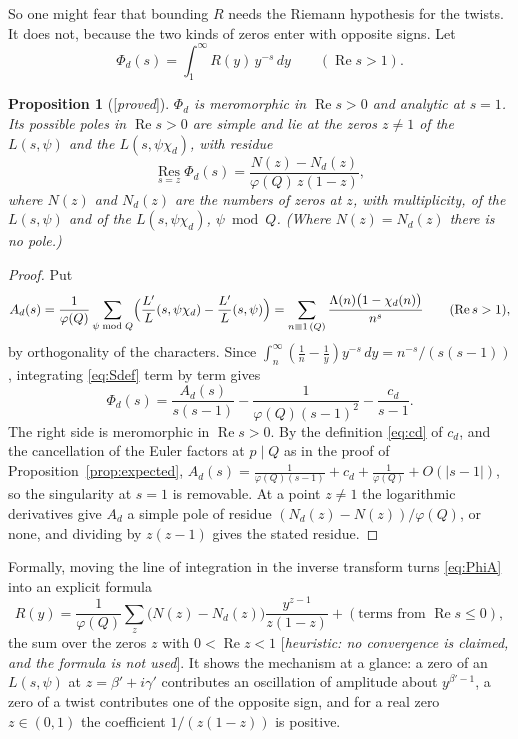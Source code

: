 \documentclass[11pt]{amsart}
\numberwithin{equation}{section}
\newtheorem{proposition}[theorem]{Proposition}
\theoremstyle{definition}
\theoremstyle{remark}
\newcommand{\re}{\operatorname{Re}}
\newcommand{\status}[1]{\textup{[\emph{#1}]}}
\begin{document}
So one might fear that bounding $R$ needs the Riemann hypothesis for the twists. It does not, because the two kinds of zeros enter with opposite signs. Let
\begin{equation}
 \Phi_d(s)=\int_1^\infty R(y)\,y^{-s}\,dy\qquad(\re s>1).
\end{equation}

\begin{proposition}[\status{proved}]\label{prop:res}
$\Phi_d$ is meromorphic in $\re s>0$ and analytic at $s=1$. Its possible poles in $\re s>0$ are simple and lie at the zeros $z\ne1$ of the $L(s,\psi)$ and the $L(s,\psi\chi_d)$, with residue
\begin{equation}
 \operatorname*{Res}_{s=z}\Phi_d(s)=\frac{N(z)-N_d(z)}{\varphi(Q)\,z(1-z)},
\end{equation}
where $N(z)$ and $N_d(z)$ are the numbers of zeros at $z$, with multiplicity, of the $L(s,\psi)$ and of the $L(s,\psi\chi_d)$, $\psi\bmod Q$. (Where $N(z)=N_d(z)$ there is no pole.)
\end{proposition}
\begin{proof}
Put
\begin{equation}\label{eq:Ad}
 A_d(s)=\frac1{\varphi(Q)}\sum_{\psi\bmod Q}\Bigl(\frac{L'}{L}(s,\psi\chi_d)-\frac{L'}{L}(s,\psi)\Bigr)=\sum_{n\equiv1\,(Q)}\frac{\Lambda(n)\bigl(1-\chi_d(n)\bigr)}{n^s}\qquad(\re s>1),
\end{equation}
by orthogonality of the characters. Since $\int_n^\infty(\frac1n-\frac1y)y^{-s}\,dy=n^{-s}/(s(s-1))$, integrating \eqref{eq:Sdef} term by term gives
\begin{equation}\label{eq:PhiA}
 \Phi_d(s)=\frac{A_d(s)}{s(s-1)}-\frac1{\varphi(Q)(s-1)^2}-\frac{c_d}{s-1}.
\end{equation}
The right side is meromorphic in $\re s>0$. By the definition \eqref{eq:cd} of $c_d$, and the cancellation of the Euler factors at $p\mid Q$ as in the proof of Proposition~\ref{prop:expected}, $A_d(s)=\frac1{\varphi(Q)(s-1)}+c_d+\frac1{\varphi(Q)}+O(|s-1|)$, so the singularity at $s=1$ is removable. At a point $z\ne1$ the logarithmic derivatives give $A_d$ a simple pole of residue $(N_d(z)-N(z))/\varphi(Q)$, or none, and dividing by $z(z-1)$ gives the stated residue.
\end{proof}

Formally, moving the line of integration in the inverse transform turns \eqref{eq:PhiA} into an explicit formula
\begin{equation}\label{eq:explicitR}
 R(y)=\frac1{\varphi(Q)}\sum_{z}\bigl(N(z)-N_d(z)\bigr)\frac{y^{z-1}}{z(1-z)}+(\text{terms from }\re s\le0),
\end{equation}
the sum over the zeros $z$ with $0<\re z<1$ \status{heuristic: no convergence is claimed, and the formula is not used}. It shows the mechanism at a glance: a zero of an $L(s,\psi)$ at $z=\beta'+i\gamma'$ contributes an oscillation of amplitude about $y^{\beta'-1}$, a zero of a twist contributes one of the opposite sign, and for a real zero $z\in(0,1)$ the coefficient $1/(z(1-z))$ is positive.
\end{document}
